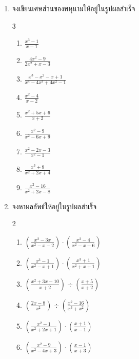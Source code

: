 \begin{enumerate}[label=\arabic*., leftmargin=*, itemsep=0.6em]
	\item จงเขียนเศษส่วนของพหุนามให้อยู่ในรูปผลสำเร็จ
\begin{multicols}{3}
	\begin{enumerate}[label=\theenumi\arabic*), leftmargin=2em, itemsep=0.6em]
	\everymath{\displaystyle}
	\item $\frac{x^3 - 1}{x - 1}$
	\item $\frac{4x^2 - 9}{2x^2 + x - 3}$
	\item $\frac{x^3 - x^2 - x + 1}{x^4 - 4x^3 + 4x^2 - 1}$
	\item $\frac{x^2-4}{x-2}$
	
	\item $\frac{x^2+5x+6}{x+2}$
	
	\item $\frac{x^2-9}{x^2-6x+9}$
	
	\item $\frac{x^2-2x-3}{x^2-1}$
	
	\item $\frac{x^3+8}{x^2+2x+4}$
	
	\item $\frac{x^2-16}{x^2+2x-8}$
\end{enumerate}
\end{multicols}
	
	\item จงหาผลลัพธ์ให้อยู่ในรูปผลสำเร็จ
	\begin{multicols}{2}
	\begin{enumerate}[label=\theenumi\arabic*), leftmargin=2em, itemsep=0.6em]
		\everymath{\displaystyle}
\item $\left(\frac{x^2 - 3x}{x^2 - x - 2}\right)
\cdot
\left(\frac{x^2 - 4}{x^2 - x - 6}\right)$

\item $\left(\frac{x^3 - 1}{x^2 - x + 1}\right)
\cdot
\left(\frac{x^3 + 1}{x^2 + x + 1}\right)$

\item $\left(\frac{x^2 + 3x - 10}{x + 2}\right)
\div
\left(\frac{x + 5}{x + 2}\right)$

\item $\left(\frac{2x - 8}{x^2}\right)
\div
\left(\frac{x^2 - 16}{x^3 + x^2}\right)$

\item $\left(\frac{x^2 - 1}{x^2 + 2x + 1}\right)
\cdot
\left(\frac{x + 1}{x - 1}\right)$

\item $\left(\frac{x^2 - 9}{x^2 - 4x + 3}\right)
\cdot
\left(\frac{x - 1}{x + 3}\right)$


\end{enumerate}
\end{multicols}
\end{enumerate}
